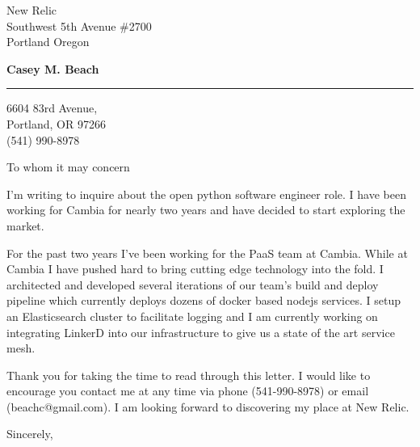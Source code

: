 \documentclass{letter} %
\begin{document}
\signature{Casey M. Beach}           %
\longindentation=0pt                       %
\let\raggedleft\raggedright                %
 
 
\begin{letter}{
New Relic \\
Southwest 5th Avenue \#2700 \\
Portland Oregon \\
}

\begin{center}
{\large\bf Casey M. Beach}
\end{center}
\medskip\hrule height 1pt
\begin{center}
6604 83rd Avenue,\\
Portland, OR 97266 \\
(541) 990-8978 
\end{center} 
\vspace{1in}

 
\opening{To whom it may concern} 
\begin{flushleft} 

\noindent I'm writing to inquire about the open python software engineer role. I have 
been working for Cambia for nearly two years and have decided to start exploring the market.

\noindent For the past two years I've been working for the PaaS team at Cambia. While at Cambia I have pushed hard
to bring cutting edge technology into the fold. I architected and developed several iterations of our team's build and 
deploy pipeline which currently deploys dozens of docker based nodejs services. I setup an Elasticsearch cluster
to facilitate logging and I am currently working on integrating LinkerD into our infrastructure to give us a state 
of the art service mesh.

\noindent Thank you for taking the time to read through this letter. I would like to encourage you
contact me at any time via phone (541-990-8978) or email (beachc@gmail.com). I am looking forward to 
discovering my place at New Relic.

\end{flushleft}
\closing{Sincerely,} 
\vfill %
\end{letter}
\end{document}
